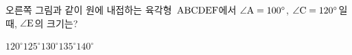 \noindent\begin{minipage}[t]{0.58\linewidth}\vspace{0pt}\raggedright 오른쪽 그림과 같이 원에 내접하는 육각형~$\mathrm{ABCDEF}$에서 $\angle\mathrm{A}=100^\circ$, $\angle\mathrm{C}=120^\circ$일 때, $\angle\mathrm{E}$의 크기는?\end{minipage}\hfill\begin{minipage}[t]{0.4\linewidth}\vspace{0pt}\centering \resizebox{\ifdim\width>\linewidth\linewidth\else\width\fi}{!}{}\end{minipage}\par
\begin{choicesii}{$120^\circ$}{$125^\circ$}{$130^\circ$}{$135^\circ$}{$140^\circ$}\end{choicesii}
